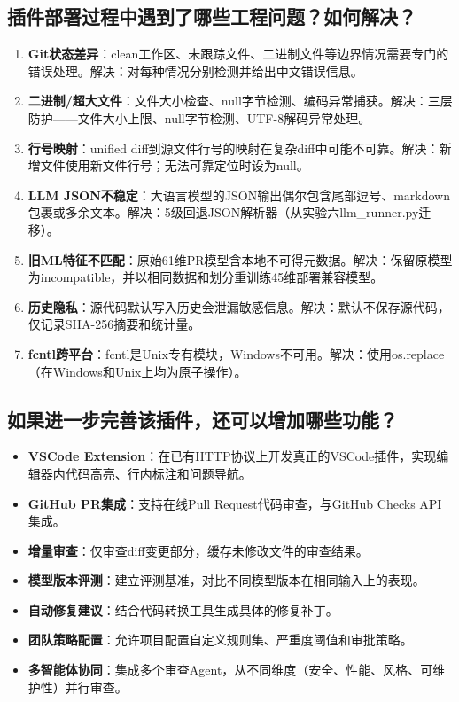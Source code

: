 \documentclass{experimentreport}
\begin{document}
\subsection{插件部署过程中遇到了哪些工程问题？如何解决？}

\begin{enumerate}
  \item \textbf{Git状态差异}：clean工作区、未跟踪文件、二进制文件等边界情况需要专门的错误处理。解决：对每种情况分别检测并给出中文错误信息。
  \item \textbf{二进制/超大文件}：文件大小检查、null字节检测、编码异常捕获。解决：三层防护——文件大小上限、null字节检测、UTF-8解码异常处理。
  \item \textbf{行号映射}：unified diff到源文件行号的映射在复杂diff中可能不可靠。解决：新增文件使用新文件行号；无法可靠定位时设为null。
  \item \textbf{LLM JSON不稳定}：大语言模型的JSON输出偶尔包含尾部逗号、markdown包裹或多余文本。解决：5级回退JSON解析器（从实验六llm\_runner.py迁移）。
  \item \textbf{旧ML特征不匹配}：原始61维PR模型含本地不可得元数据。解决：保留原模型为incompatible，并以相同数据和划分重训练45维部署兼容模型。
  \item \textbf{历史隐私}：源代码默认写入历史会泄漏敏感信息。解决：默认不保存源代码，仅记录SHA-256摘要和统计量。
  \item \textbf{fcntl跨平台}：fcntl是Unix专有模块，Windows不可用。解决：使用os.replace（在Windows和Unix上均为原子操作）。
\end{enumerate}

\subsection{如果进一步完善该插件，还可以增加哪些功能？}

\begin{itemize}
  \item \textbf{VSCode Extension}：在已有HTTP协议上开发真正的VSCode插件，实现编辑器内代码高亮、行内标注和问题导航。
  \item \textbf{GitHub PR集成}：支持在线Pull Request代码审查，与GitHub Checks API集成。
  \item \textbf{增量审查}：仅审查diff变更部分，缓存未修改文件的审查结果。
  \item \textbf{模型版本评测}：建立评测基准，对比不同模型版本在相同输入上的表现。
  \item \textbf{自动修复建议}：结合代码转换工具生成具体的修复补丁。
  \item \textbf{团队策略配置}：允许项目配置自定义规则集、严重度阈值和审批策略。
  \item \textbf{多智能体协同}：集成多个审查Agent，从不同维度（安全、性能、风格、可维护性）并行审查。
\end{itemize}
\end{document}
